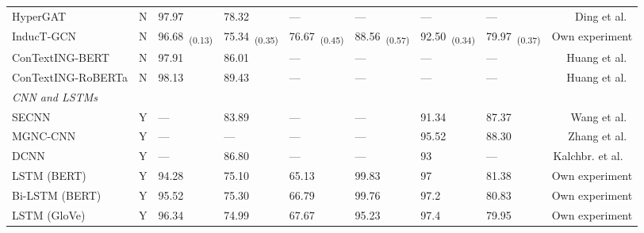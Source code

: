\documentclass[runningheads]{llncs}
\begin{document}
\begin{table*}[!ht]
\begin{threeparttable}
{\begin{tabular}{lcllllllr}
            HyperGAT                                & N                   & 97.97            & 78.32          & ---                               & ---              & ---           & ---            & Ding et al.~\cite{ding-etal-2020-hypergat} \\
            InducT-GCN                              & N                   & 96.68~\textsubscript{(0.13)}            & 75.34~\textsubscript{(0.35)}          & 76.67~\textsubscript{(0.45)}                             & 88.56~\textsubscript{(0.57)}            & 92.50~\textsubscript{(0.34)}          & 79.97~\textsubscript{(0.37)}          & Own experiment                  \\
            ConTextING-BERT                         & N                   & 97.91            & 86.01          & ---                                & ---              & ---           & ---           & Huang et al.~\cite{huang-etal-2022-contexting}                 \\
            ConTextING-RoBERTa                      & N                   & 98.13            & 89.43          & ---                                & ---              & ---           & ---           & Huang et al.~\cite{huang-etal-2022-contexting}                 \\
            \midrule
            \textit{CNN and LSTMs} \\
            SECNN\tnote{$3$}                        & Y                   & ---              & 83.89          & ---                               & ---              & 91.34         & 87.37          & Wang et al.~\cite{wang2021short}           \\
    MGNC-CNN & Y & --- & --- & --- & --- & 95.52 & 88.30\tnote{$7$} & Zhang et al.~\cite{DBLP:conf/naacl/ZhangRW16} \\ 
    DCNN     & Y & --- & 86.80\tnote{$8$} & --- & --- & 93 & --- & Kalchbr. et al.
    ~\cite{DBLP:conf/acl/KalchbrennerGB14} \\
            LSTM (BERT)                             & Y                   & 94.28            & 75.10          & 65.13                             & 99.83            & 97            & 81.38          & Own experiment                  \\
            Bi-LSTM (BERT)                          & Y                   & 95.52            & 75.30          & 66.79                             & 99.76            & 97.2          & 80.83          & Own experiment                  \\
            LSTM (GloVe)                            & Y                   & 96.34            & 74.99          & 67.67                             & 95.23            & 97.4          & 79.95          & Own experiment                  \\

\end{tabular}}
\end{threeparttable}
\end{table*}
\end{document}
